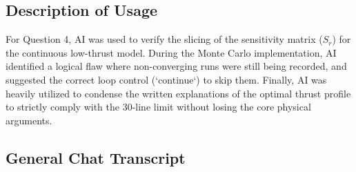 \documentclass[a4paper,12pt]{article}
\begin{document}
\subsection*{Description of Usage}
For Question 4, AI was used to verify the slicing of the sensitivity matrix ($S_r$) for the continuous low-thrust model. During the Monte Carlo implementation, AI identified a logical flaw where non-converging runs were still being recorded, and suggested the correct loop control (`continue`) to skip them. Finally, AI was heavily utilized to condense the written explanations of the optimal thrust profile to strictly comply with the 30-line limit without losing the core physical arguments.
\subsection*{General Chat Transcript}


\end{document}
